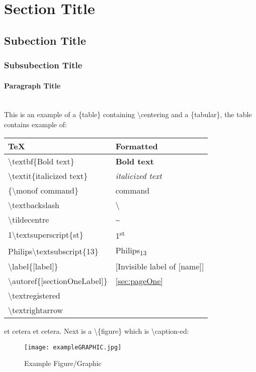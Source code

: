 \section{Section Title}\label{sec:pageOne}

\subsection{Subection Title}\label{ssec:ssecOne}
\subsubsection{Subsubection Title}\label{sssec:sssecOne}
\paragraph{Paragraph Title}\label{par:parOne}~\\

This is an example of a \{table\} containing \textbackslash{}centering and a \{tabular\}, the table contains example of:
\begin{table}[H]
	\centering
	\begin{tabular}{ | C{.45\textwidth} | C{.45\textwidth} | } \hline
		\textbf{TeX} & \textbf{Formatted} \\ \hline
		\textbackslash{}textbf\{Bold text\} & \textbf{Bold text} \\
		\textbackslash{}textit\{italicized text\} & \textit{italicized text} \\
		\{\textbackslash{}monof command\} & {\monof command} \\
		\textbackslash{}textbackslash & \textbackslash \\
		\textbackslash{}tildecentre & \textasciitilde \\
		1\textbackslash{}textsuperscript\{st\} & 1\textsuperscript{st} \\
		Philips\textbackslash{}textsubscript\{13\} & Philips\textsubscript{13} \\
		\textbackslash{}label\{[label]\} & [Invisible label of [name]] \\
		\textbackslash{}autoref\{[sectionOneLabel]\} & \autoref{sec:pageOne} \\
		\textbackslash{}textregistered & \textregistered \\
		\textbackslash{}textrightarrow & \textrightarrow \\
		\hline
	\end{tabular}
\end{table}

et cetera et cetera. Next is a \textbackslash{}\{figure\} which is \textbackslash{}caption-ed:

\begin{figure}[h!]
	\centering
	\texttt{[image: exampleGRAPHIC.jpg]}
	\caption{Example Figure/Graphic}
	\label{fig:example}
\end{figure}
